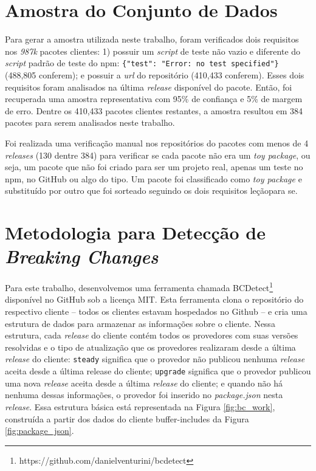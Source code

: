 \section{Amostra do Conjunto de Dados}
\label{sec:col_amostra}
Para gerar a amostra utilizada neste trabalho, foram verificados dois requisitos nos \textit{987k} pacotes clientes: 1) possuir um \textit{script} de teste não vazio e diferente do \textit{script} padrão de teste do \textsf{npm}: \texttt{\{"test": "Error: no test specified"\}} (488,805 conferem); e possuir a \textit{url} do repositório (410,433 conferem). Esses dois requisitos foram analisados na última \textit{release} disponível do pacote. Então, foi recuperada uma amostra representativa com 95\% de confiança e 5\% de margem de erro. Dentre os 410,433 pacotes clientes restantes, a amostra resultou em 384 pacotes para serem analisados neste trabalho.

Foi realizada uma verificação manual nos repositórios do pacotes com menos de 4 \textit{releases} (130 dentre 384) para verificar se cada pacote não era um \textit{toy package}, ou seja, um pacote que não foi criado para ser um projeto real, apenas um teste no \textsf{npm}, no \textsf{GitHub} ou algo do tipo. Um pacote foi classificado como \textit{toy package} e substituído por outro que foi sorteado seguindo os dois requisitos leçãopara se.

\section{Metodologia para Detecção de \textit{Breaking Changes}}
\label{sec:bcdetect}
Para este trabalho, desenvolvemos uma ferramenta chamada \textsf{BCDetect}\footnote{https://github.com/danielventurini/bcdetect} disponível no \textsf{GitHub} sob a licença \textsf{MIT}. Esta ferramenta clona o repositório do respectivo cliente -- todos os clientes estavam hospedados no \textsf{Github} -- e cria uma estrutura de dados para armazenar as informações sobre o cliente. Nessa estrutura, cada \textit{release} do cliente contém todos os provedores com suas versões resolvidas e o tipo de atualização que os provedores realizaram desde a última \textit{release} do cliente: \texttt{steady} significa que o provedor não publicou nenhuma \textit{release} aceita desde a última release do cliente; \texttt{upgrade} significa que o provedor publicou uma nova \textit{release} aceita desde a última \textit{release} do cliente; e quando não há nenhuma dessas informações, o provedor foi inserido no \textit{package.json} nesta \textit{release}. Essa estrutura básica está representada na Figura \ref{fig:bc_work}, construída a partir dos dados do cliente \textsf{buffer-includes} da Figura \ref{fig:package_json}.

